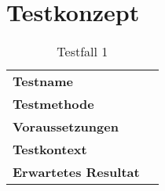 \section{Testkonzept}

\begin{table}[H]
    \begin{tabular}{|L{0.3\textwidth}|L{0.65\textwidth}|}
        \hline
           \\[10pt]
        \hline
        \textbf{Testname} &  \\
        \hline
        \textbf{Testmethode} &  \\
        \hline
        \textbf{Voraussetzungen} & \\
        \hline
        \textbf{Testkontext} & \\
        \hline
        \textbf{Erwartetes Resultat} & \\
        \hline
    \end{tabular}
    \caption{Testfall 1}
\end{table}
